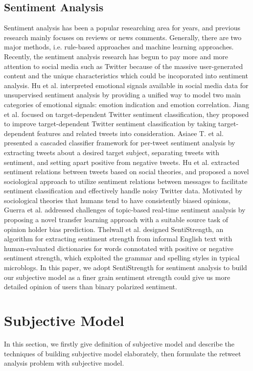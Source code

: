 \documentclass[preprint,times]{elsarticle}
\begin{document}
\subsection{Sentiment Analysis}
Sentiment analysis has been a popular researching area for years, and previous research mainly focuses on reviews or news comments. 
Generally, there are two major methods, i.e. rule-based approaches and machine learning approaches. 
Recently, the sentiment analysis research has begun to pay more and more attention to social media such as Twitter because of the massive user-generated content and the unique characteristics which could be incoporated into sentiment analysis. 
Hu et al.\cite{Hu:2013www} interpreted emotional signals available in social media data for unsupervised sentiment analysis by providing a unified way to model two main categories of emotional signals: emotion indication and emotion correlation. 
Jiang et al.\cite{Jiang:2011TTS} focused on target-dependent Twitter sentiment classification, they proposed to improve target-dependent Twitter sentiment classification by taking target-dependent features and related tweets into consideration. 
Asiaee T. et al.\cite{AsiaeeT:2012} presented a cascaded classifier framework for per-tweet sentiment analysis by extracting tweets about a desired target subject, separating tweets with sentiment, and setting apart positive from negative tweets.
Hu et al.\cite{Hu:2013ESR} extracted sentiment relations between tweets based on social theories, and proposed a novel sociological approach to utilize sentiment relations between messages to facilitate sentiment classification and effectively handle noisy Twitter data.
Motivated by sociological theories that humans tend to have consistently biased opinions, Guerra et al.\cite{CalaisGuerra:2011BOT} addressed challenges of topic-based real-time sentiment analysis by proposing a novel transfer learning approach with a suitable source task of opinion holder bias prediction.
Thelwall et al.\cite{Thelwall:2010SSS,Thelwall:2012SSD} designed SentiStrength, an algorithm for extracting sentiment strength from informal English text with human-evaluated dictionaries for words connotated with positive or negative sentiment strength, which exploited the grammar and spelling styles in typical microblogs.
In this paper, we adopt SentiStrength for sentiment analysis to build our subjective model as a finer grain sentiment strength could give us more detailed opinion of users than binary polarized sentiment.
\section{Subjective Model}
\label{subjectivemodel}
In this section, we firstly give definition of subjective model and describe the techniques of building subjective model elaborately, then formulate the retweet analysis problem with subjective model.
\end{document}
